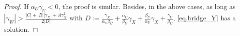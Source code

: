 \documentclass[10pt,a4paper]{amsart}
\begin{document}
\begin{proof}
If $\alpha_U\gamma_U<0$, the proof is similar. Besides, in the above cases, as long as $|\gamma_W| >\frac{|C|+|B||\gamma_X|+A\gamma_X^2}{2|D|}$ with $D:=\frac{\gamma_X}{\alpha_U\beta_U}+\frac{\alpha_U}{\beta_U}\gamma_X+\frac{\beta_U}{\alpha_U}\gamma_X+\frac{\gamma_U}{\beta_U}$,  \eqref{eq.bridge_Y} has a solution. 
\end{proof}
\end{document}
